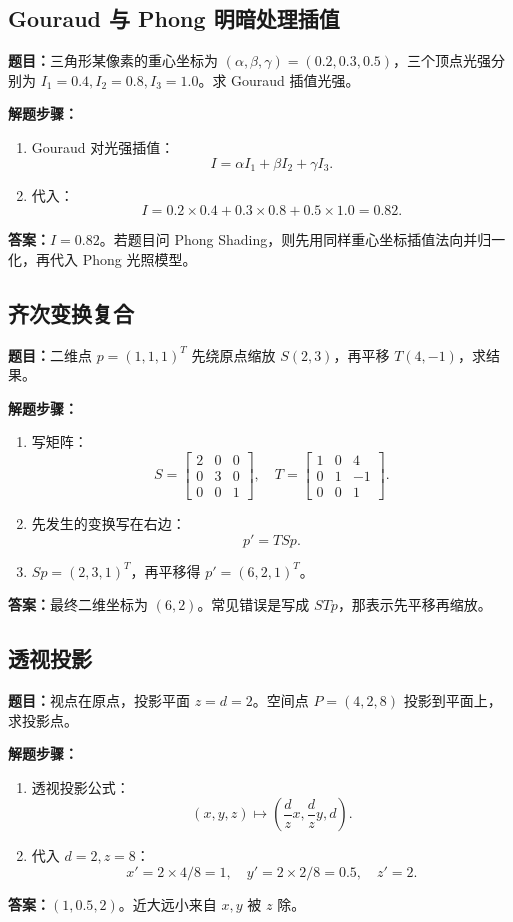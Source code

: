 \documentclass[UTF8,zihao=-4,scheme=chinese,fontset=fandol]{ctexart}
\begin{document}
\subsection{Gouraud 与 Phong 明暗处理插值}
\textbf{题目：}三角形某像素的重心坐标为 $(\alpha,\beta,\gamma)=(0.2,0.3,0.5)$，三个顶点光强分别为 $I_1=0.4,I_2=0.8,I_3=1.0$。求 Gouraud 插值光强。

\textbf{解题步骤：}
\begin{enumerate}
  \item Gouraud 对光强插值：
  \[
  I=\alpha I_1+\beta I_2+\gamma I_3.
  \]
  \item 代入：
  \[
  I=0.2\times0.4+0.3\times0.8+0.5\times1.0=0.82.
  \]
\end{enumerate}
\textbf{答案：}$I=0.82$。若题目问 Phong Shading，则先用同样重心坐标插值法向并归一化，再代入 Phong 光照模型。

\subsection{齐次变换复合}
\textbf{题目：}二维点 $p=(1,1,1)^T$ 先绕原点缩放 $S(2,3)$，再平移 $T(4,-1)$，求结果。

\textbf{解题步骤：}
\begin{enumerate}
  \item 写矩阵：
  \[
  S=\begin{bmatrix}2&0&0\\0&3&0\\0&0&1\end{bmatrix},\quad
  T=\begin{bmatrix}1&0&4\\0&1&-1\\0&0&1\end{bmatrix}.
  \]
  \item 先发生的变换写在右边：
  \[
  p'=TSp.
  \]
  \item $Sp=(2,3,1)^T$，再平移得 $p'=(6,2,1)^T$。
\end{enumerate}
\textbf{答案：}最终二维坐标为 $(6,2)$。常见错误是写成 $STp$，那表示先平移再缩放。

\subsection{透视投影}
\textbf{题目：}视点在原点，投影平面 $z=d=2$。空间点 $P=(4,2,8)$ 投影到平面上，求投影点。

\textbf{解题步骤：}
\begin{enumerate}
  \item 透视投影公式：
  \[
  (x,y,z)\mapsto\left(\frac dzx,\frac dzy,d\right).
  \]
  \item 代入 $d=2,z=8$：
  \[
  x'=2\times4/8=1,\quad y'=2\times2/8=0.5,\quad z'=2.
  \]
\end{enumerate}
\textbf{答案：}$(1,0.5,2)$。近大远小来自 $x,y$ 被 $z$ 除。
\end{document}
